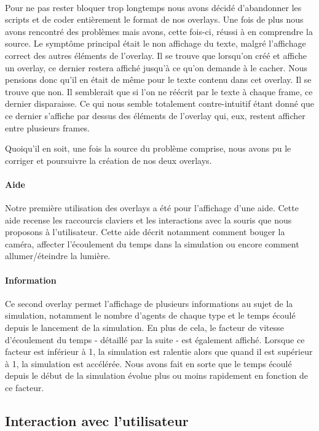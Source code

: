 \paragraph{}
Pour ne pas rester bloquer trop longtemps nous avons décidé d'abandonner les
scripts et de coder entièrement le format de nos overlays. Une fois de plus
nous avons rencontré des problèmes mais avons, cette fois-ci, réussi à en
comprendre la source. Le symptôme principal était le non affichage du texte,
malgré l'affichage correct des autres éléments de l'overlay. Il se trouve que
lorsqu'on créé et affiche un overlay, ce dernier restera affiché jusqu'à ce
qu'on demande à le cacher. Nous pensions donc qu'il en était de même pour le
texte contenu dans cet overlay. Il se trouve que non. Il semblerait que si
l'on ne réécrit par le texte à chaque frame, ce dernier disparaisse. Ce qui
nous semble totalement contre-intuitif étant donné que ce dernier s'affiche
par dessus des éléments de l'overlay qui, eux, restent afficher entre
plusieurs frames.

Quoiqu'il en soit, une fois la source du problème comprise, nous avons pu
le corriger et poursuivre la création de nos deux overlays.

\paragraph{Aide}
Notre première utilisation des overlays a été pour l'affichage d'une aide.
Cette aide recense les raccourcis claviers et les interactions avec la souris
que nous proposons à l'utilisateur. Cette aide décrit notamment comment bouger
la caméra, affecter l'écoulement du temps dans la simulation ou encore comment
allumer/éteindre la lumière.

\paragraph{Information}
Ce second overlay permet l'affichage de plusieurs informations au sujet de la
simulation, notamment le nombre d'agents de chaque type et le temps écoulé
depuis le lancement de la simulation.
En plus de cela, le facteur de vitesse d'écoulement du temps - détaillé par la
suite - est également affiché. Lorsque ce facteur est inférieur à 1, la
simulation est ralentie alors que quand il est supérieur à 1, la simulation
est accélérée. Nous avons fait en sorte que le temps écoulé depuis le début de
la simulation évolue plus ou moins rapidement en fonction de ce facteur.

\subsection{Interaction avec l'utilisateur}

